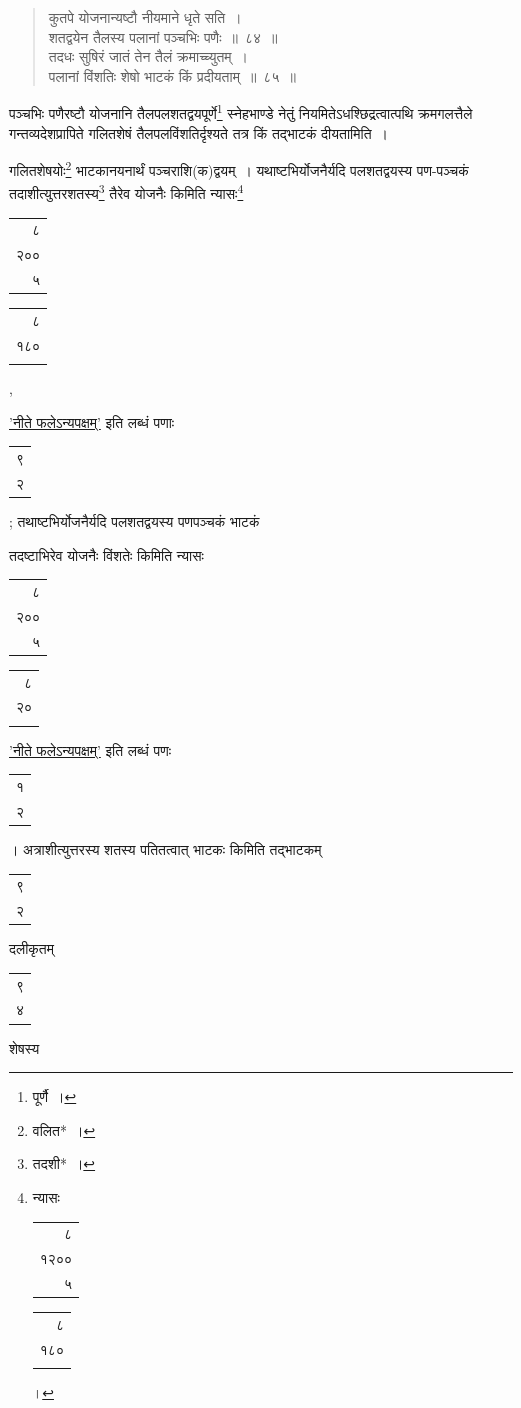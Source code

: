 \documentclass[10pt, openany]{book}
\begin{document}
{{{{{\begin{quote}
{\eg कुतपे योजनान्यष्टौ नीयमाने धृते सति~। \\
 शतद्वयेन तैलस्य पलानां पञ्चभिः पणैः~॥~८४~॥ \\
 तदधः सुषिरं जातं तेन तैलं क्रमाच्च्युतम्~। \\
 पलानां विंशतिः शेषो भाटकं किं प्रदीयताम्~॥~८५~॥} \end{quote}

{पञ्चभिः पणैरष्टौ योजनानि तैलपलशतद्वयपूर्णे\renewcommand{\thefootnote}{\s २}\footnote{\s पूर्णै~।}  स्नेहभाण्डे नेतुं
नियमितेऽधश्छिद्रत्वात्पथि}
{क्रमगलत्तैले गन्तव्यदेशप्रापिते गलितशेषं तैलपलविंशतिर्दृश्यते तत्र किं
तद्भाटकं दीयतामिति~।}
\vspace{-0.5mm}

{गलितशेषयोः\renewcommand{\thefootnote}{\s ३}\footnote{\s वलित*~।}  भाटकानयनार्थं पञ्चराशि(क)द्वयम्~। यथाष्टभिर्योजनैर्यदि
पलशतद्वयस्य पण-पञ्चकं तदाशीत्युत्तरशतस्य\renewcommand{\thefootnote}{\s ४}\footnote{\s तदशी*~।}  तैरेव योजनैः किमिति
न्यासः\renewcommand{\thefootnote}{\s ५}\footnote{\s न्यासः\textemdash
\begin{tabular}{r|}८\\१२००\\५\end{tabular}\begin{tabular}{r}८\\१८० \\ \\\end{tabular}।}\begin{tabular}{r|}८\\ २००\\५ \end{tabular}\begin{tabular}{r}८\\  १८० \\ \\ \end{tabular}}, {\hyperref[45]{'नीते फलेऽन्यपक्षम्'} इति लब्धं पणाः\begin{tabular}{r}९ \\२\end{tabular}; तथाष्टभिर्योजनैर्यदि
पलशतद्वयस्य पणपञ्चकं भाटकं}
{तदष्टाभिरेव योजनैः विंशतेः किमिति न्यासः\begin{tabular}{r|}८\\ २००\\५ \end{tabular}\begin{tabular}{r}८\\  २० \\ \\\end{tabular}}\hyperref[45]{'नीते फलेऽन्यपक्षम्'} इति लब्धं पणः\begin{tabular}{r}१\\ २\end{tabular}। अत्राशीत्युत्तरस्य शतस्य पतितत्वात् भाटकः किमिति तद्भाटकम्\begin{tabular}{r}९\\ २\end{tabular}दलीकृतम्\begin{tabular}{r}९\\ ४\end{tabular}शेषस्य}
}}}}
\end{document}

